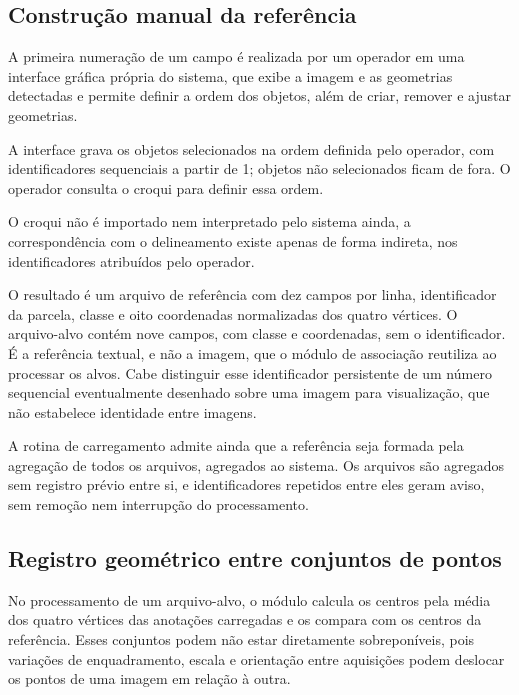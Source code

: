\subsection{Constru\c{c}\~ao manual da refer\^encia}
\label{sec:construcao-manual-referencia}

A primeira numera\c{c}\~ao de um campo \'e realizada por um operador em uma interface gr\'afica pr\'opria do sistema, que exibe a imagem e as geometrias detectadas e permite definir a ordem dos objetos, al\'em de criar, remover e ajustar geometrias.

A interface grava os objetos selecionados na ordem definida pelo operador, com identificadores sequenciais a partir de 1; objetos n\~ao selecionados ficam de fora. O operador consulta o croqui para definir essa ordem.

O croqui n\~ao \'e importado nem interpretado pelo sistema ainda, a correspond\^encia com o delineamento existe apenas de forma indireta, nos identificadores atribu\'idos pelo operador.

O resultado \'e um arquivo de refer\^encia com dez campos por linha, identificador da parcela, classe e oito coordenadas normalizadas dos quatro v\'ertices. O arquivo-alvo cont\'em nove campos, com classe e coordenadas, sem o identificador. \'E a refer\^encia textual, e n\~ao a imagem, que o m\'odulo de associa\c{c}\~ao reutiliza ao processar os alvos. Cabe distinguir esse identificador persistente de um n\'umero sequencial eventualmente desenhado sobre uma imagem para visualiza\c{c}\~ao, que n\~ao estabelece identidade entre imagens.

A rotina de carregamento admite ainda que a refer\^encia seja formada pela agrega\c{c}\~ao de todos os arquivos, agregados ao sistema. Os arquivos s\~ao agregados sem registro pr\'evio entre si, e identificadores repetidos entre eles geram aviso, sem remo\c{c}\~ao nem interrup\c{c}\~ao do processamento.

\subsection{Registro geom\'etrico entre conjuntos de pontos}
\label{sec:registro-geometrico-pontos}

No processamento de um arquivo-alvo, o m\'odulo calcula os centros pela m\'edia dos quatro v\'ertices das anota\c{c}\~oes carregadas e os compara com os centros da refer\^encia. Esses conjuntos podem n\~ao estar diretamente sobrepon\'iveis, pois varia\c{c}\~oes de enquadramento, escala e orienta\c{c}\~ao entre aquisi\c{c}\~oes podem deslocar os pontos de uma imagem em rela\c{c}\~ao \`a outra.

